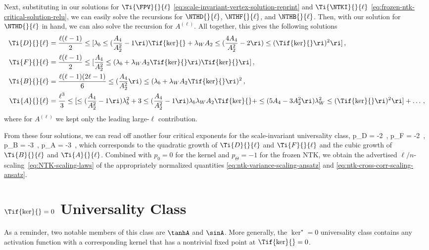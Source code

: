 Next, substituting in our solutions for $\Ti{\FPV}{}{\ell}$ \eqref{eq:scale-invariant-vertex-solution-reprint} and $\Ti{\NTKI}{}{\ell}$ \eqref{eq:frozen-ntk-critical-solution-relu},
we can easily solve the recursions for $\NTHD{}{\ell}$, $\NTHF{}{\ell}$, and $\NTHB{}{\ell}$.
Then, with our solution for $\NTHD{}{\ell}$ in hand, we can also solve the recursion for $A^{(\ell)}$. All together, this gives the following solutions
\begin{align}
\Ti{D}{}{\ell}&=\frac{\ell(\ell-1)}{2}\le[\lambda_b \le(\frac{A_4}{A_2^2}-1\ri)\Tif{\ker}{}+\lambda_W A_2 \le(\frac{4A_4}{A_2^2}-2\ri)\le(\Tif{\ker}{}\ri)^2 \ri] \, ,\\
\label{eq:F-solution}
\Ti{F}{}{\ell}&=\frac{\ell(\ell-1)}{2}\le[\frac{A_4}{A_2^2} \le(\lambda_b+\lambda_W A_2 \Tif{\ker}{}\ri)\Tif{\ker}{}\ri] \, ,\\
\Ti{B}{}{\ell}&=\frac{\ell(\ell-1)(2\ell-1)}{6}\le(\frac{A_4}{A_2^2}\ri)\le(\lambda_b+\lambda_W A_2 \Tif{\ker}{}\ri)^2\, ,\\
\Ti{A}{}{\ell}&=\frac{\ell^3}{3}\le[
    \le(\frac{A_4}{A_2^2}-1\ri) \lambda_b^2 + 3\le(\frac{A_4}{A_2^2}-1\ri) \lambda_b \lambda_W A_2 \Tif{\ker}{} + \le(5 A_4 - 3 A_2^2 \ri) \lambda_W^2 \le(\Tif{\ker}{}\ri)^2
\ri] + \ldots \, ,
\end{align}
where for $A^{(\ell)}$ we kept only the leading large-$\ell$ contribution.

From these four solutions, we can read off another four critical exponents for the scale-invariant universality class,
\be\label{eq:NTK-agited-exponents-scale-invariant}
p_D = -2\, , \qquad p_F = -2\, , \qquad p_B = -3\, , \qquad p_A = -3\, ,
\ee
which corresponds to the quadratic growth of $\Ti{D}{}{\ell}$ and $\Ti{F}{}{\ell}$ and the cubic growth of $\Ti{B}{}{\ell}$ and $\Ti{A}{}{\ell}$. 
Combined with $p_0=0$ for the kernel and $p_{\Theta}=-1$ for the frozen NTK, we obtain the advertised $\ell/n$-scaling~\eqref{eq:NTK-scaling-laws} of the appropriately           normalized quantities 
\eqref{eq:ntk-variance-scaling-ansatz} and \eqref{eq:ntk-cross-corr-scaling-ansatz}.






\section{\texorpdfstring{$\Tif{\ker}{}=0$}{K*=0} Universality Class}\label{sec:ntk_criticality_tanh_univ}
As a reminder, two notable members of this class are $\tanhA$ and $\sinA$. More generally, the $\ker^\star=0$ universality class contains any activation function with a corresponding kernel that has a nontrivial fixed point at $\Tif{\ker}{}=0$. 

